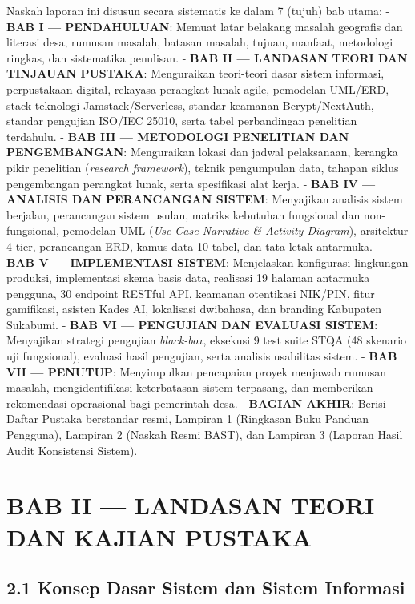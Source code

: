 \documentclass[
  indonesian,
  12pt,
]{report}
\begin{document}
Naskah laporan ini disusun secara sistematis ke dalam 7 (tujuh) bab
utama: - \textbf{BAB I --- PENDAHULUAN}: Memuat latar belakang masalah
geografis dan literasi desa, rumusan masalah, batasan masalah, tujuan,
manfaat, metodologi ringkas, dan sistematika penulisan. - \textbf{BAB II
--- LANDASAN TEORI DAN TINJAUAN PUSTAKA}: Menguraikan teori-teori dasar
sistem informasi, perpustakaan digital, rekayasa perangkat lunak agile,
pemodelan UML/ERD, stack teknologi Jamstack/Serverless, standar keamanan
Bcrypt/NextAuth, standar pengujian ISO/IEC 25010, serta tabel
perbandingan penelitian terdahulu. - \textbf{BAB III --- METODOLOGI
PENELITIAN DAN PENGEMBANGAN}: Menguraikan lokasi dan jadwal pelaksanaan,
kerangka pikir penelitian (\emph{research framework}), teknik
pengumpulan data, tahapan siklus pengembangan perangkat lunak, serta
spesifikasi alat kerja. - \textbf{BAB IV --- ANALISIS DAN PERANCANGAN
SISTEM}: Menyajikan analisis sistem berjalan, perancangan sistem usulan,
matriks kebutuhan fungsional dan non-fungsional, pemodelan UML
(\emph{Use Case Narrative \& Activity Diagram}), arsitektur 4-tier,
perancangan ERD, kamus data 10 tabel, dan tata letak antarmuka. -
\textbf{BAB V --- IMPLEMENTASI SISTEM}: Menjelaskan konfigurasi
lingkungan produksi, implementasi skema basis data, realisasi 19 halaman
antarmuka pengguna, 30 endpoint RESTful API, keamanan otentikasi
NIK/PIN, fitur gamifikasi, asisten Kades AI, lokalisasi dwibahasa, dan
branding Kabupaten Sukabumi. - \textbf{BAB VI --- PENGUJIAN DAN EVALUASI
SISTEM}: Menyajikan strategi pengujian \emph{black-box}, eksekusi 9 test
suite STQA (48 skenario uji fungsional), evaluasi hasil pengujian, serta
analisis usabilitas sistem. - \textbf{BAB VII --- PENUTUP}: Menyimpulkan
pencapaian proyek menjawab rumusan masalah, mengidentifikasi
keterbatasan sistem terpasang, dan memberikan rekomendasi operasional
bagi pemerintah desa. - \textbf{BAGIAN AKHIR}: Berisi Daftar Pustaka
berstandar resmi, Lampiran 1 (Ringkasan Buku Panduan Pengguna), Lampiran
2 (Naskah Resmi BAST), dan Lampiran 3 (Laporan Hasil Audit Konsistensi
Sistem).

\newpage

\chapter{BAB II --- LANDASAN TEORI DAN KAJIAN
PUSTAKA}\label{bab-ii-landasan-teori-dan-kajian-pustaka}

\section{2.1 Konsep Dasar Sistem dan Sistem
Informasi}\label{konsep-dasar-sistem-dan-sistem-informasi}
\end{document}
